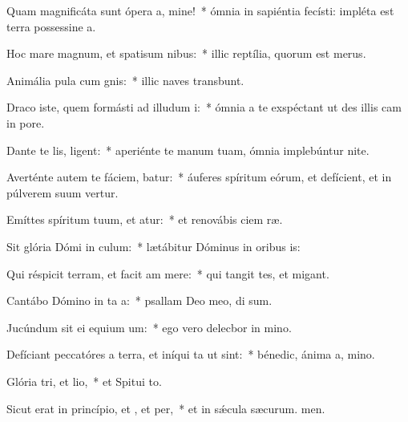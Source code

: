 \item Quam magnificáta sunt ópera a, mine!~* ómnia in sapiéntia fecísti: impléta est terra possessine a.
\item Hoc mare magnum, et spatisum nibus:~* illic reptília, quorum  est merus.
\item Animália pula cum gnis:~* illic naves transbunt.
\item Draco iste, quem formásti ad illudum i:~* ómnia a te exspéctant ut des illis cam in pore.
\item Dante te lis, ligent:~* aperiénte te manum tuam, ómnia implebúntur nite.
\item Averténte autem te fáciem, batur:~* áuferes spíritum eórum, et defícient, et in púlverem suum vertur.
\item Emíttes spíritum tuum, et atur:~* et renovábis ciem ræ.
\item Sit glória Dómi in culum:~* lætábitur Dóminus in oribus is:
\item Qui réspicit terram, et facit am mere:~* qui tangit tes, et migant.
\item Cantábo Dómino in ta a:~* psallam Deo meo, di sum.
\item Jucúndum sit ei equium um:~* ego vero delecbor in mino.
\item Defíciant peccatóres a terra, et iníqui ta ut  sint:~* bénedic, ánima a, mino.
\item Glória tri, et lio,~* et Spitui to.
\item Sicut erat in princípio, et , et per,~* et in sǽcula sæcurum. men.
